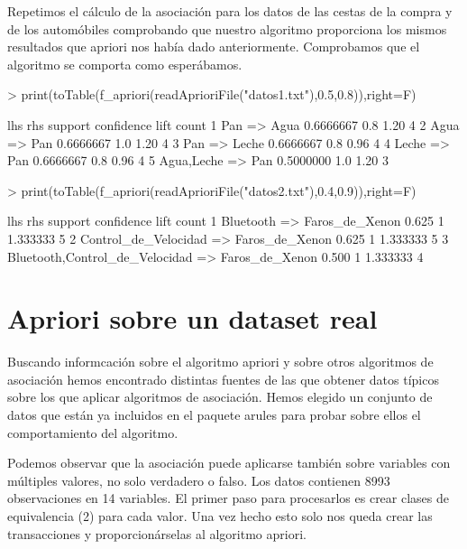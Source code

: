 \documentclass [a4paper] {article}
\begin{document}
Repetimos el cálculo de la asociación para los datos de las cestas de la compra y de los automóbiles comprobando que nuestro algoritmo proporciona
los mismos resultados que apriori nos había dado anteriormente. Comprobamos que el algoritmo se comporta como esperábamos.
\begin{Schunk}
\begin{Sinput}
> print(toTable(f_apriori(readAprioriFile("datos1.txt"),0.5,0.8)),right=F)
\end{Sinput}
\begin{Soutput}
  lhs             rhs     support   confidence lift count
1 {Pan}        => {Agua}  0.6666667 0.8        1.20 4    
2 {Agua}       => {Pan}   0.6666667 1.0        1.20 4    
3 {Pan}        => {Leche} 0.6666667 0.8        0.96 4    
4 {Leche}      => {Pan}   0.6666667 0.8        0.96 4    
5 {Agua,Leche} => {Pan}   0.5000000 1.0        1.20 3    
\end{Soutput}
\begin{Sinput}
> print(toTable(f_apriori(readAprioriFile("datos2.txt"),0.4,0.9)),right=F)
\end{Sinput}
\begin{Soutput}
  lhs                                 rhs              support confidence lift     count
1 {Bluetooth}                      => {Faros_de_Xenon} 0.625   1          1.333333 5    
2 {Control_de_Velocidad}           => {Faros_de_Xenon} 0.625   1          1.333333 5    
3 {Bluetooth,Control_de_Velocidad} => {Faros_de_Xenon} 0.500   1          1.333333 4    
\end{Soutput}
\end{Schunk}

\section{Apriori sobre un dataset real}
Buscando informcación sobre el algoritmo apriori y sobre otros algoritmos de asociación hemos encontrado distintas fuentes de las que obtener datos típicos 
sobre los que aplicar algoritmos de asociación.
Hemos elegido un conjunto de datos que están ya incluidos en el paquete arules para probar sobre ellos el comportamiento del algoritmo.

Podemos observar que la asociación puede aplicarse también sobre variables con múltiples valores, no solo verdadero o falso.
Los datos contienen 8993 observaciones en 14 variables. El primer paso para procesarlos es crear clases de equivalencia (2) para cada valor.
Una vez hecho esto solo nos queda crear las transacciones y proporcionárselas al algoritmo apriori.
\end{document}
